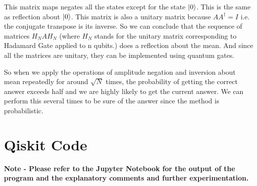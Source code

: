 \documentclass[a4paper]{article}
\begin{document}
This matrix maps negates all the states except for the state $\ket{0}$. This is the same as reflection about $\ket{0}$. This matrix is also a unitary matrix because $A A^{\dagger} = I$ i.e. the conjugate transpose is its inverse. So we can conclude that the sequence of matrices $H_N A H_N$ (where $H_N$ stands for the unitary matrix corresponding to Hadamard Gate applied to n qubits.) does a reflection about the mean. And since all the matrices are unitary, they can be implemented using quantum gates.

So when we apply the operations of amplitude negation and inversion about mean repeatedly for around $\sqrt{N}$ times, the probability of getting the correct answer exceeds half and we are highly likely to get the current answer. We can perform this several times to be sure of the answer since the method is probabilistic.

\section{Qiskit Code}
\textbf{Note - Please refer to the Jupyter Notebook for the output of the program and the explanatory comments and further experimentation.}
\end{document}
